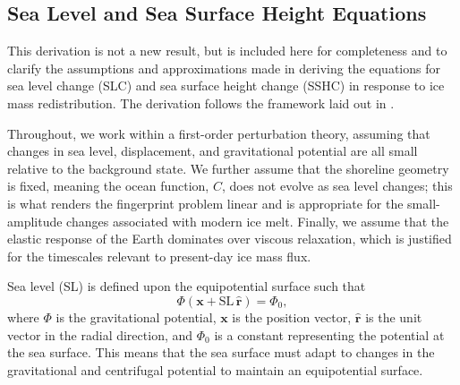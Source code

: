 \subsection{Sea Level and Sea Surface Height Equations}\label{sec:sea_level_equations}

This derivation is not a new result, but is included here for completeness
and to clarify the assumptions and approximations made in deriving the
equations for sea level change (SLC) and sea surface height change (SSHC)
in response to ice mass redistribution. The derivation follows the framework
laid out in \textcite{al-attarReciprocitySensitivityKernels2023}.

Throughout, we work within a first-order perturbation theory, assuming that
changes in sea level, displacement, and gravitational potential are all small
relative to the background state. We further assume that the shoreline
geometry is fixed, meaning the ocean function, $C$, does not evolve as sea
level changes; this is what renders the fingerprint problem linear and is
appropriate for the small-amplitude changes associated with modern ice melt.
Finally, we assume that the elastic response of the Earth dominates over
viscous relaxation, which is justified for the timescales relevant to
present-day ice mass flux.

Sea level (SL) is defined upon the equipotential surface such that
%
\begin{equation}
    \Phi\left(\mathbf{x} + \mathrm{SL}\,\hat{\mathbf{r}}\right) = \Phi_0,
    \label{eq:sl_definition}
\end{equation}
%
where $\Phi$ is the gravitational potential, $\mathbf{x}$ is the position
vector, $\hat{\mathbf{r}}$ is the unit vector in the radial direction, and
$\Phi_0$ is a constant representing the potential at the sea surface. This
means that the sea surface must adapt to changes in the gravitational and
centrifugal potential to maintain an equipotential surface.

